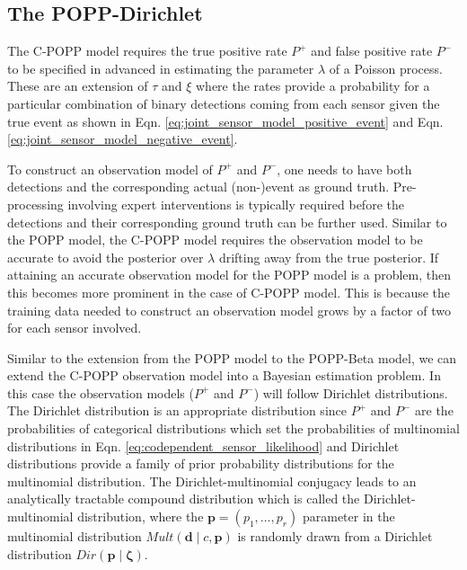 
\subsection{The POPP-Dirichlet}
\label{subsec:popd}

The C-POPP model requires the true positive rate $P^+$ and false positive rate $P^-$ to be specified in advanced in estimating the parameter $\lambda$ of a Poisson process. These are an extension of $\tau$ and $\xi$ where the rates provide a probability for a particular combination of binary detections coming from each sensor given the true event as shown in Eqn. \ref{eq:joint_sensor_model_positive_event} and Eqn. \ref{eq:joint_sensor_model_negative_event}.

To construct an observation model of $P^+$ and $P^-$, one needs to have both detections and the corresponding actual (non-)event as ground truth. Pre-processing involving expert interventions is typically required before the detections and their corresponding ground truth can be further used. Similar to the POPP model, the C-POPP model requires the observation model to be accurate to avoid the posterior over $\lambda$ drifting away from the true posterior. If attaining an accurate observation model for the POPP model is a problem, then this becomes more prominent in the case of C-POPP model. This is because the training data needed to construct an observation model grows by a factor of two for each sensor involved.       

Similar to the extension from the POPP model to the POPP-Beta model, we can extend the C-POPP observation model into a Bayesian estimation problem. In this case the observation models ($P^+$ and $P^-$) will follow Dirichlet distributions. The Dirichlet distribution is an appropriate distribution since $P^+$ and $P^-$ are the probabilities of categorical distributions which set the probabilities of multinomial distributions in Eqn. \ref{eq:codependent_sensor_likelihood} and Dirichlet distributions provide a family of prior probability distributions for the multinomial distribution. The Dirichlet-multinomial conjugacy leads to an analytically tractable compound distribution which is called the Dirichlet-multinomial distribution, where the $\mathbf{p} = (p_1, \ldots, p_r)$ parameter in the multinomial distribution $Mult(\mathbf{d} \mid c, \mathbf{p})$ is randomly drawn from a Dirichlet distribution $Dir(\mathbf{p} \mid \mathbf{\zeta})$. 

